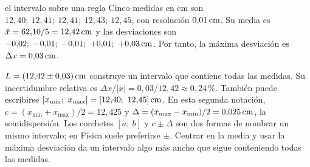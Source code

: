 \documentclass[11pt,a4paper]{article}
\begin{document}
\begin{examplebox}{el intervalo sobre una regla}
Cinco medidas en cm son $12{,}40;\ 12{,}41;\ 12{,}41;\ 12{,}43;\ 12{,}45$, con
resoluci\'on $0{,}01\,\mathrm{cm}$. Su media es
$\bar x=62{,}10/5=12{,}42\,\mathrm{cm}$ y las desviaciones son
$-0{,}02;\ -0{,}01;\ -0{,}01;\ +0{,}01;\ +0{,}03\units{cm}$.
Por tanto, la m\'axima desviaci\'on es $\Delta x=0{,}03\,\mathrm{cm}$.
\begin{center}
\end{center}
$L=(12{,}42\pm0{,}03)\,\mathrm{cm}$ construye un intervalo que contiene todas las
medidas. Su incertidumbre relativa es $\Delta x/|\bar x|=0{,}03/12{,}42\approx0{,}24\,\text{\%}$.
Tambi\'en puede escribirse
$[x_{\min};\ x_{\max}]=[12{,}40;\ 12{,}45]\units{cm}$. En esta segunda notaci\'on,
$c=(x_{\min}+x_{\max})/2=12{,}425$ y
$\Delta=(x_{\max}-x_{\min})/2=0{,}025\,\mathrm{cm}$, la semidispersi\'on.
Los corchetes $[a;\ b]$ y $c\pm\Delta$ son dos formas de nombrar un mismo
intervalo; en F\'isica suele preferirse $\pm$. Centrar en la media y usar la
m\'axima desviaci\'on da un intervalo algo m\'as ancho que sigue conteniendo
todas las medidas.
\end{examplebox}
\end{document}
